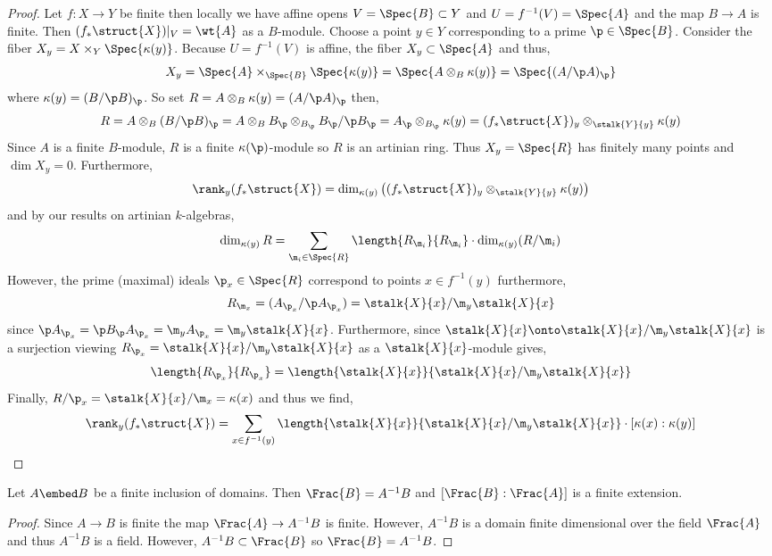 \documentclass[12pt]{article}
\begin{document}
\begin{proof}
Let $f : X \to Y$ be finite then locally we have affine opens $V = \Spec{B} \subset Y$ and $U = f^{-1}(V) = \Spec{A}$ and the map $B \to A$ is finite. Then $(f_* \struct{X})|_V = \wt{A}$ as a $B$-module. Choose a point $y \in Y$ corresponding to a prime $\p \in \Spec{B}$.
Consider the fiber $X_y = X \times_{Y} \Spec{\kappa(y)}$. Because $U = f^{-1}(V)$ is affine, the fiber $X_y \subset \Spec{A}$ and thus,
\[ X_y = \Spec{A} \times_{\Spec{B}} \Spec{\kappa(y)} = \Spec{A \otimes_B \kappa(y)} = \Spec{(A / \p A)_\p} \]
where $\kappa(y) = (B / \p B)_\p$. So set $R = A \otimes_B \kappa(y) = (A / \p A)_\p$ then,
\[ R = A \otimes_B (B / \p B)_\p = A \otimes_B B_\p \otimes_{B_\p} B_\p / \p B_\p  = A_\p \otimes_{B_\p} \kappa(y) = (f_* \struct{X})_y \otimes_{\stalk{Y}{y}} \kappa(y) \] 
Since $A$ is a finite $B$-module, $R$ is a finite $\kappa(\p)$-module so $R$ is an artinian ring. Thus $X_y = \Spec{R}$ has finitely many points and $\dim{X_y} = 0$. Furthermore,
\[ \rank_y{(f_* \struct{X})} = \dim_{\kappa(y)} \left( (f_* \struct{X})_y \otimes_{\stalk{Y}{y}} \kappa(y) \right) \]
and by our results on artinian $k$-algebras,
\[ \dim_{\kappa(y)}{R} = \sum_{\m_i \in \Spec{R}} \length{R_{\m_i}}{R_{\m_i}} \cdot \dim_{\kappa(y)} (R / \m_i) \]
However, the prime (maximal) ideals $\p_x \in \Spec{R}$ correspond to points $x \in f^{-1}(y)$ furthermore,
\[ R_{\m_x} = (A_{\p_x} / \p A_{\p_x}) = \stalk{X}{x} / \m_y \stalk{X}{x} \] since $\p A_{\p_x} = \p B_\p A_{\p_x} = \m_y A_{\p_x} = \m_y \stalk{X}{x}$. Furthermore, since $\stalk{X}{x} \onto \stalk{X}{x} / \m_y \stalk{X}{x}$ is a surjection viewing $R_{\p_x} = \stalk{X}{x} / \m_y \stalk{X}{x}$ as a $\stalk{X}{x}$-module gives,
\[ \length{R_{\p_x}}{R_{\p_x}} = \length{\stalk{X}{x}}{\stalk{X}{x} / \m_y \stalk{X}{x}} \]
Finally, $R / \p_x = \stalk{X}{x} / \m_x = \kappa(x)$ and thus we find,
\[ \rank_y{(f_* \struct{X})} = \sum_{x \in f^{-1}(y)} \length{\stalk{X}{x}}{\stalk{X}{x} / \m_y \stalk{X}{x}} \cdot [\kappa(x) : \kappa(y)] \]
\end{proof}


\begin{lemma}
Let $A \embed B$ be a finite inclusion of domains. Then $\Frac{B} = A^{-1} B$ and $[ \Frac{B} : \Frac{A}]$ is a finite extension.
\end{lemma}

\begin{proof}
Since $A \to B$ is finite the map $\Frac{A} \to A^{-1} B$ is finite. However, $A^{-1} B$ is a domain finite dimensional over the field $\Frac{A}$ and thus $A^{-1} B$ is a field. However, $A^{-1} B \subset \Frac{B}$ so $\Frac{B} = A^{-1} B$.
\end{proof}
\end{document}
